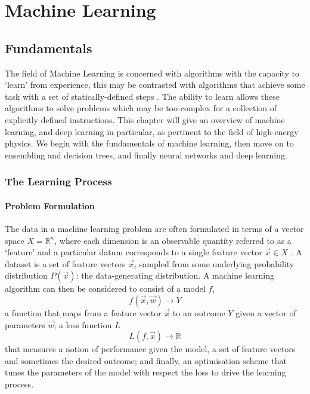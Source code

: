 \chapter{Machine Learning}
\label{chap:machine_learning}



\section{Fundamentals}
The field of Machine Learning is concerned with algorithms with the capacity to `learn' from experience, this may be contrasted with algorithms that achieve some task with a set of statically-defined steps \cite{DeepLearningBook}. The ability to learn allows these algorithms to solve problems which may be too complex for a collection of explicitly defined instructions. 
This chapter will give an overview of machine learning, and deep learning in particular, as pertinent to the field of high-energy physics. We begin with the fundamentals of machine learning, then move on to ensembling and decision trees, and finally neural networks and deep learning.  


\subsection{The Learning Process}

\subsubsection{Problem Formulation}
The data in a machine learning problem are often formulated in terms of a vector space $X = \mathds{R}^{n}$, where each dimension is an observable quantity referred to as a `feature' and a particular datum corresponds to a single feature vector $\vec{x} \in X$ \cite{elementsOfStatsLearning}. A dataset is a set of feature vectors $\vec{x}_{i}$ sampled from some underlying probability distribution $P(\vec{x})$: the data-generating distribution.
A machine learning algorithm can then be considered \cite{elementsOfStatsLearning} to consist of a model $f$, 
\begin{equation}
    f(\vec{x},\vec{w})\rightarrow{Y}
\end{equation}
a function that maps from a feature vector $\vec{x}$ to an outcome $Y$ given a vector of parameters $\vec{w}$; a loss function $L$
\begin{equation}
    L(f,\vec{x})\rightarrow{\mathds{R}}
\end{equation}
that measures a notion of performance given the model, a set of feature vectors and sometimes the desired outcome; 
and finally, an optimisation scheme that tunes the parameters of the model with respect the loss to drive the learning process.


